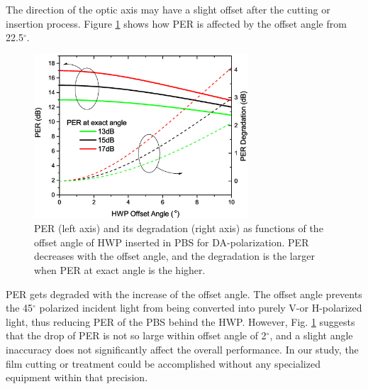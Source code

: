 \documentclass[letterpaper, 10pt]{article}
\begin{document}
The direction of the optic axis may have a slight offset after the cutting  or  insertion process.
Figure \ref{fig:angle_offset} shows how PER is affected by the offset angle from 22.5$^\circ$.
\begin{figure}
  \centering
  \includegraphics[width=8cm]{./offset_angle}
  \caption{PER (left axis) and its degradation (right axis) as functions of the offset angle of HWP inserted in PBS for DA-polarization. PER decreases with the offset angle, and the degradation is the larger when PER at exact angle is the higher.}
  \label{fig:angle_offset}
\end{figure}
PER gets degraded with the increase of the offset angle.
The offset angle prevents the 45$^\circ$ polarized incident light from being converted into purely V-or H-polarized light, thus reducing PER of the PBS behind the HWP.
However, Fig. \ref{fig:angle_offset} suggests that the drop of PER is not so large within  offset angle of 2$^\circ$, and  a slight angle inaccuracy does not significantly affect the overall performance.
In our study, the film cutting or treatment could be accomplished without any specialized equipment within that precision.
\end{document}
